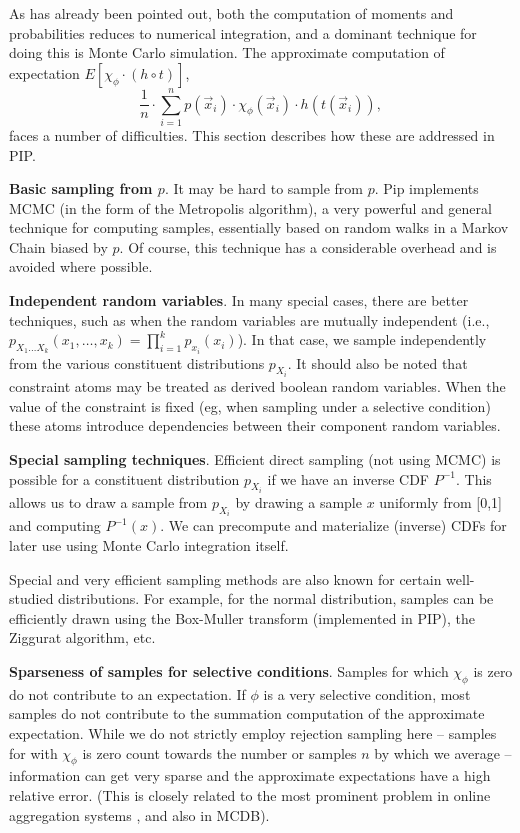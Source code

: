 

As has already been pointed out,
both the computation of moments and probabilities reduces to numerical
integration, and a dominant technique for doing this is Monte Carlo simulation.
The approximate computation of expectation
$E[\chi_\phi \cdot (h \circ t)]$,
\begin{equation}
\frac{1}{n} \cdot \sum_{i=1}^n p(\vec{x}_i) \cdot \chi_\phi(\vec{x}_i) \cdot
h(t(\vec{x}_i)),
\end{equation}
faces a number of difficulties.
This section describes how these are addressed in PIP.

{\bf Basic sampling from $p$}.
It may be hard to sample from $p$.
Pip implements MCMC (in the form of the Metropolis algorithm),
a very powerful and general technique for computing samples, essentially based
on random walks in a Markov Chain biased by $p$. Of course, this technique
has a considerable overhead and is avoided where possible.

{\bf Independent random variables}.
In many special cases, there are better techniques, such as
when the random variables are mutually independent (i.e.,
$p_{X_1 \dots X_k}(x_1, \dots, x_k) = \prod_{i=1}^k p_{x_i}(x_i)$).
In that case, we sample independently from the various constituent
distributions $p_{X_i}$.  It should also be noted that constraint atoms may 
be treated as derived boolean random variables.  When the value of the constraint is
fixed (eg, when sampling under a selective condition) these atoms introduce
dependencies between their component random variables.

{\bf Special sampling techniques}.
Efficient direct sampling (not using MCMC) is possible for a constituent
distribution $p_{X_i}$ if we have  an inverse CDF $P^{-1}$. This allows
us to draw a sample from $p_{X_i}$ by drawing a sample $x$ uniformly from [0,1]
and computing $P^{-1}(x)$.
We can precompute and materialize (inverse) CDFs for later use using Monte
Carlo integration itself.

Special and very efficient sampling methods are also known
for certain  well-studied distributions.
For example, for the normal distribution, samples can be efficiently drawn
using the Box-Muller transform (implemented in PIP), the Ziggurat algorithm, etc.

{\bf Sparseness of samples for selective conditions}.
Samples for which $\chi_{\phi}$ is zero do not contribute
to an expectation.
If $\phi$ is a very selective condition, most samples do not
contribute to the summation computation of the
approximate expectation.
While we do not strictly employ rejection sampling here --
samples for with $\chi_{\phi}$ is zero count towards the number or samples
$n$ by which we average -- information can get very sparse and the approximate
expectations have a high relative error.
(This is closely related to the most prominent problem in online
aggregation systems \cite{OnlineAggregation,DBO}, and also in MCDB).

